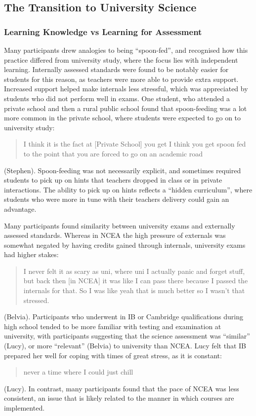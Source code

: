 \documentclass[a4paper,man,natbib]{apa6}
\begin{document}
\subsection{The Transition to University Science}
\subsubsection{Learning Knowledge vs Learning for Assessment}
Many participants drew analogies to being ``spoon-fed'', and recognised how this practice differed from university study, where the focus lies with independent learning. Internally assessed standards were found to be notably easier for students for this reason, as teachers were more able to provide extra support. Increased support helped make internals less stressful, which was appreciated by students who did not perform well in exams. One student, who attended a private school and then a rural public school found that spoon-feeding was a lot more common in the private school, where students were expected to go on to university study: \blockquote{I think it is the fact at [Private School] you get I think you get spoon fed to the point that you are forced to go on an academic road}. (Stephen). Spoon-feeding was not necessarily explicit, and sometimes required students to pick up on hints that teachers dropped in class or in private interactions. The ability to pick up on hints reflects a ``hidden curriculum'', where students who were more in tune with their teachers delivery could gain an advantage. 

Many participants found similarity between university exams and externally assessed standards. Whereas in NCEA the high pressure of externals was somewhat negated by having credits gained through internals, university exams had higher stakes: \blockquote{I never felt it as scary as uni, where uni I actually panic and forget stuff, but back then [in NCEA] it was like I can pass there because I passed the internals for that. So I was like yeah that is much better so I wasn't that stressed.} (Belvia). Participants who underwent in IB or Cambridge qualifications during high school tended to be more familiar with testing and examination at university, with participants suggesting that the science assessment was ``similar'' (Lucy), or more ``relevant'' (Belvia) to university than NCEA. Lucy felt that IB prepared her well for coping with times of great stress, as it is constant: \blockquote{never a time where I could just chill 
} (Lucy). In contrast, many participants found that the pace of NCEA was less consistent, an issue that is likely related to the manner in which courses are implemented. 
\end{document}
